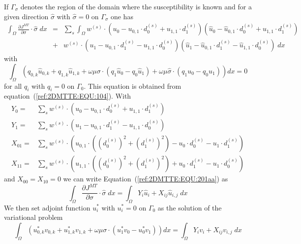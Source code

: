 If $\Gamma_{\sigma}$ denotes the region of the domain where the susceptibility is
known and for a given direction $\hat{\sigma}$ with $\hat{\sigma}=0$ on $\Gamma_{\sigma}$ one has
\begin{align}\label{ref:2DMTTE:EQU:201aa}
\int_{\Omega}   \frac{\partial J^{MT}}{\partial \sigma} \cdot \hat{\sigma} \; dx  & = &
\sum_{s} \int_{\Omega}  w^{(s)} \cdot \left(  u_0 - u_{0,1} \cdot d_0^{(s)} + u_{1,1} \cdot d_1^{(s)}  \right ) \left(  \hat{u}_0 - \hat{u}_{0,1} \cdot d_0^{(s)} + \hat{u}_{1,1}\cdot d_1^{(s)}  \right )  \\
& + &  w^{(s)} \cdot \left(u_1- u_{0,1} \cdot d_1^{(s)} -u_{1,1} \cdot d_0^{(s)}  \right)   \left(\hat{u}_1- \hat{u}_{0,1} \cdot d_1^{(s)} -\hat{u}_{1,1} \cdot d_0^{(s)} \right) \; dx 
\end{align} 
with
\begin{equation}\label{ref:2DMTTE:EQU:201A}
\int_{\Omega}
\left(
q_{0,k}\hat{u}_{0,k}
+ q_{1,k}\hat{u}_{1,k}
+ \omega \mu \sigma \cdot ( q_1 \hat{u}_0 - q_0 \hat{u}_1)   
+ \omega \mu \hat{\sigma} \cdot ( q_1 u_0 - q_0 u_1) \right) dx =0
\end{equation}
for all $q_i$ with $q_i=0$ on $\Gamma_{0}$. This equation is obtained from equation~(\ref{ref:2DMTTE:EQU:104}).
With
\begin{align}\label{ref:2DMTTE:EQU:202c}
Y_0  = & \sum_{s} w^{(s)} \cdot \left(  u_0 - u_{0,1} \cdot d_0^{(s)} + u_{1,1} \cdot d_1^{(s)}  \right) \\
Y_1  = & \sum_{s} w^{(s)} \cdot \left(  u_1 - u_{0,1} \cdot d_1^{(s)} - u_{1,1} \cdot d_0^{(s)}  \right)   \\
X_{01}  = &  \sum_{s} w^{(s)} \cdot \left(    u_{0,1} \cdot ( ( d_0^{(s)})^2 + (d_1^{(s)})^2) -  u_0 \cdot d_0^{(s)} -  u_1 \cdot d_1^{(s)} \right)    \\
X_{11}  = & \sum_{s} w^{(s)} \cdot \left(  u_{1,1} \cdot ( ( d_0^{(s)})^2 + (d_1^{(s)})^2)  + u_0 \cdot d_1^{(s)} - u_1 \cdot d_0^{(s)} \right)
\end{align} 
and $X_{00}=X_{10}=0$ we can write Equation~(\ref{ref:2DMTTE:EQU:201aa}) as 
\begin{equation}\label{ref:2DMTTE:EQU:202c}
\int_{\Omega}   \frac{\partial J^{MT}}{\partial \sigma} \cdot \hat{\sigma} \; dx  =
\int_{\Omega}  Y_i \hat{u}_i + X_{ij}  \hat{u}_{i,j} \; dx
\end{equation}
We then set adjoint function $u_i^*$ with $u_i^*=0$ on $\Gamma_{0}$ as the solution of the variational problem  
\begin{equation}\label{ref:2DMTTE:EQU:202d}
\int_{\Omega}
\left(
u^*_{0,k} v_{0,k}
+ u^*_{1,k} v_{1,k}
+ \omega \mu \sigma \cdot ( u^*_1 v_0 - u^*_0 v_1) \right) dx = \int_{\Omega}  Y_i v_i + X_{ij}  v_{i,j} \; dx  
\end{equation}
